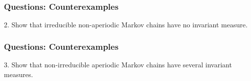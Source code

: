 \documentclass{beamer}
\begin{document}
\begin{frame}[t]
\frametitle{Questions: Counterexamples}
2. Show that irreducible non-aperiodic Markov chains have no invariant measure.
\pause
\end{frame}

\begin{frame}[t]
\frametitle{Questions: Counterexamples}
3. Show that non-irreducible aperiodic Markov chains have several invariant measures.
\pause
\end{frame}
\end{document}
